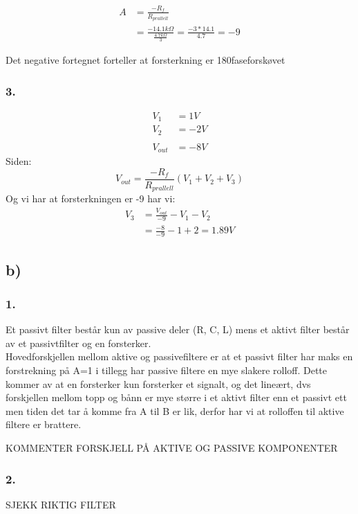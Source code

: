 \documentclass[a4paper, norsk, twoside, 10pt]{article}
\begin{document}
\begin{align*}
  A &= \frac{-R_{f}}{R_{prallell}} \\
  &= \frac{-14.1k\Omega}{\frac{4.7k\Omega}{3}}  = \frac{-3*14.1}{4.7}  = -9
\end{align*}

Det negative fortegnet forteller at forsterkning er 180\degree faseforskøvet



\subsubsection*{3.}
\begin{align*}
  V_{1} &= 1V \\
  V_{2} &= -2V\\
  \\
  V_{out} &= -8V
\end{align*}
Siden:
\[V_{out} = \frac{-R_{f}}{R_{prallell}} (V_{1} + V_{2} + V_{3})\]
Og vi har at forsterkningen er -9 har vi:
\begin{align*}
  V_{3} &= \frac{V_{out}}{-9}- V_{1} - V_{2} \\
  &= \frac{-8}{-9}- 1 + 2 = 1.89 V
\end{align*}


\subsection*{b)}
\subsubsection*{1.}
Et passivt filter består kun av passive deler (R, C, L) mens et aktivt filter består av et passivtfilter og en forsterker. \\
Hovedforskjellen mellom aktive og passivefiltere er at et passivt filter har maks en forstrekning på A=1 i tillegg har passive filtere en mye slakere rolloff. Dette kommer av at en forsterker kun forsterker et signalt, og det lineært, dvs forskjellen mellom topp og bånn er mye større i et aktivt filter enn et passivt ett men tiden det tar å komme fra A til B er lik, derfor har vi at rolloffen til aktive filtere er brattere.



KOMMENTER FORSKJELL PÅ AKTIVE OG PASSIVE KOMPONENTER


\subsubsection*{2.}
SJEKK RIKTIG FILTER
\end{document}
